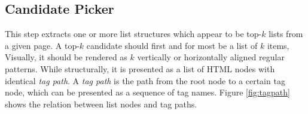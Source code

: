 

\subsection{Candidate Picker}
\label{sec:picker}





This step extracts one or more list structures which appear to be top-$k$ lists
from a given page.
%
A top-$k$ candidate should first and for most be a list of $k$ items,
Visually, it should be rendered as
$k$ vertically or horizontally aligned regular patterns.
While structurally, it is presented as a list of HTML nodes with
identical \emph{tag path}.
A \emph{tag path} is the path
from the root node to a certain tag node, which can be presented as
a sequence of tag names.  Figure \ref{fig:tagpath} shows the relation
between list nodes and tag paths.

